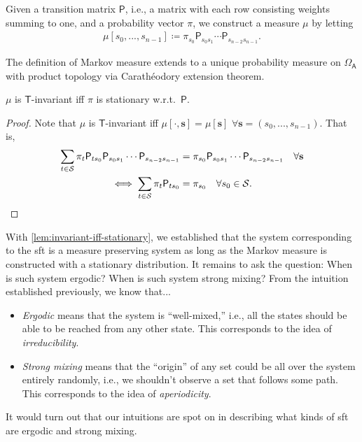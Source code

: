 \documentclass[a4paper]{article}
\begin{document}
\begin{definition}
	Given a transition matrix $\mathsf{P}$, i.e.,
	a matrix with each row consisting weights summing to one,
	and a probability vector $\pi$,
	we construct a measure $\mu$ by letting
	\begin{align*}
		\mu[s_0,...,s_{n-1}] \coloneqq \pi_{s_0} \mathsf{P}_{s_0s_1} \cdots \mathsf{P}_{s_{n-2}s_{n-1}}.
	\end{align*}
\end{definition}

\begin{remark}
	The definition of Markov measure extends to a unique probability measure on $\Omega_{\mathsf{A}}$
	with product topology via Carath\'eodory extension theorem.
\end{remark}

\begin{lemma}\label{lem:invariant-iff-stationary}
	$\mu$ is $\mathsf{T}$-invariant iff $\pi$ is stationary w.r.t.\ $\mathsf{P}$.
\end{lemma}
\begin{proof}
	Note that $\mu$ is $\mathsf{T}$-invariant iff $\mu[\cdot,\mathbf{s}]=\mu[\mathbf{s}]$ $\forall\mathbf{s}=(s_0,...,s_{n-1})$.
	That is,
	\begin{align*}
		\sum_{t\in\mathcal{S}} \pi_{t}\mathsf{P}_{t s_0}\mathsf{P}_{s_0s_1} \cdots \mathsf{P}_{s_{n-2}s_{n-1}}
		&= \pi_{s_0}\mathsf{P}_{s_0s_1} \cdots \mathsf{P}_{s_{n-2}s_{n-1}} \quad\forall\mathbf{s}\\
		\iff
		\sum_{t\in\mathcal{S}} \pi_{t}\mathsf{P}_{t s_0} &= \pi_{s_0} \quad\forall s_0\in\mathcal{S}.
		\qedhere
	\end{align*}
\end{proof}

\begin{remark}
	With \autoref{lem:invariant-iff-stationary}, we established that the system corresponding to the \gls{sft} is a measure preserving system
	as long as the Markov measure is constructed with a stationary distribution.
	It remains to ask the question: When is such system ergodic? When is such system strong mixing?
	From the intuition established previously, we know that...
	\begin{itemize}
		\item
			\emph{Ergodic} means that the system is ``well-mixed,''
			i.e., all the states should be able to be reached from any other state.
			This corresponds to the idea of \emph{irreducibility}.
		\item
			\emph{Strong mixing} means that the ``origin'' of any set could be all over the system entirely randomly,
			i.e., we shouldn't observe a set that follows some path.
			This corresponds to the idea of \emph{aperiodicity}.
	\end{itemize}
	It would turn out that our intuitions are spot on in describing what kinds of \gls{sft} are ergodic and strong mixing.
\end{remark}
\end{document}
